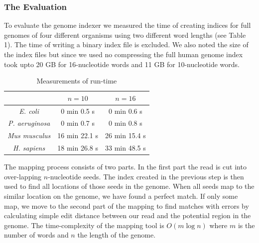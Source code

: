 \documentclass[portrait, a0paper, margin=7cm]{baposter}
\begin{document}
\begin{poster}
{\subsubsection*{The Evaluation}
To evaluate the genome indexer we measured the time of creating indices for full genomes of four different organisms using two different word lengths (see Table 1). The time of writing a binary index file is excluded. We also noted the size of the index files but since we used no compressing the full human genome index took upto 20 GB for 16-nucleotide words and 11 GB for 10-nucleotide words.

\begin{table}[H]
\begin{center}
\caption {Measurements of run-time} 

\begin{tabular}{ccc}
& $n = 10$ & $n = 16$\\
\hline
\textit{E. coli} & 0 min 0.5 s & 0 min 0.6 s\\
\hline
\textit{P. aeruginosa} & 0 min 0.7 s & 0 min 0.8 s\\
\hline
\textit{Mus musculus} & 16 min 22.1 s & 26 min 15.4 s\\
\hline
\textit{H. sapiens} & 18 min 26.8 s & 33 min 48.5 s\\
\end {tabular}
\end{center}
\end{table}

}



 {
The mapping process consists of two parts. In the first part the read is cut into over-lapping $n$-nucleotide seeds. The index created in the previous step is then used to find all locations of those seeds in the genome. When all seeds map to the similar location on the genome, we have found a perfect match. If only some map, we move to the second part of the mapping to find matches with errors by calculating simple edit distance between our read and the potential region in the genome. The time-complexity of the mapping tool is $O(m\log n)$ where $m$ is the number of words and $n$ the length of the genome.

}
\end{poster}
\end{document}
